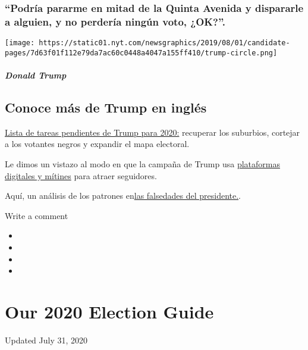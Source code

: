 \hypertarget{podruxeda-pararme-en-mitad-de-la-quinta-avenida-y-dispararle-a-alguien-y-no-perderuxeda-ninguxfan-voto-ok}{%
\subsubsection{``Podría pararme en mitad de la Quinta Avenida y
dispararle a alguien, y no perdería ningún voto,
¿OK?''.}\label{podruxeda-pararme-en-mitad-de-la-quinta-avenida-y-dispararle-a-alguien-y-no-perderuxeda-ninguxfan-voto-ok}}

\texttt{[image: https://static01.nyt.com/newsgraphics/2019/08/01/candidate-pages/7d63f01f112e79da7ac60c0448a4047a155ff410/trump-circle.png]}

\hypertarget{donald-trump-1}{%
\subparagraph{Donald Trump}\label{donald-trump-1}}

\hypertarget{conoce-muxe1s-de-trump-en-ingluxe9s}{%
\subsection{Conoce más de Trump en
inglés}\label{conoce-muxe1s-de-trump-en-ingluxe9s}}

\href{https://www.nytimes.com/2020/02/08/us/politics/trump-reelection-campaign.html}{Lista
de tareas pendientes de Trump para 2020:} recuperar los suburbios,
cortejar a los votantes negros y expandir el mapa electoral.

Le dimos un vistazo al modo en que la campaña de Trump usa
\href{https://www.nytimes.com/2020/02/27/us/politics/trump-rally-campaign-data.html}{plataformas
digitales y mítines} para atraer seguidores.

Aquí, un análisis de los patrones
en\href{https://www.nytimes.com/2018/12/29/us/politics/trump-fact-check.html}{las
falsedades del presidente.}.

Write a comment

\begin{itemize}
\item
\item
\item
\item
\end{itemize}

\hypertarget{our-2020-election-guide}{%
\section{Our 2020 Election Guide}\label{our-2020-election-guide}}

Updated July 31, 2020


